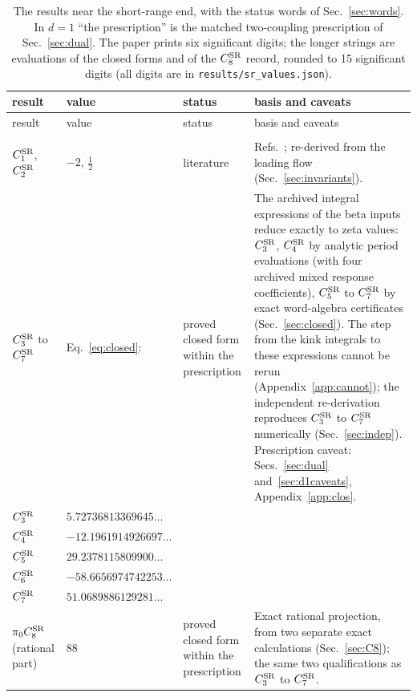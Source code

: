 \documentclass[11pt,a4paper]{article}
\numberwithin{equation}{section}
\newcommand{\CSR}{C^{\rm SR}}
\begin{document}
{\small
\renewcommand{\arraystretch}{1.2}
\begin{longtable}{@{}>{\raggedright\arraybackslash}p{}>{\raggedright\arraybackslash}p{}>{\raggedright\arraybackslash}p{}>{\raggedright\arraybackslash}p{}@{}}
\caption{The results near the short-range end, with the status words of Sec.~\ref{sec:words}. In $d=1$ ``the
prescription'' is the matched two-coupling prescription of Sec.~\ref{sec:dual}. The paper prints six significant
digits; the longer strings are evaluations of the closed forms and of the $\CSR_8$ record, rounded to 15 significant
digits (all digits are in \texttt{results/sr\_values.json}).}\label{tab:main}\\
\toprule
result & value & status & basis and caveats\\
\midrule\endfirsthead
\toprule
result & value & status & basis and caveats\\
\midrule\endhead
\bottomrule\endfoot
\multicolumn{4}{@{}l}{$d=1$}\\
$\CSR_1$, $\CSR_2$ & $-2$, $\frac12$ & literature & Refs.~\cite{Benedetti:2024wgx,Benedetti:2025nzp}; re-derived from the leading flow (Sec.~\ref{sec:invariants}).\\
$\CSR_3$ to $\CSR_7$ & Eq.~\eqref{eq:closed}: & proved closed form within the prescription & The archived integral expressions of the beta inputs reduce exactly to zeta values: $\CSR_3$, $\CSR_4$ by analytic period evaluations (with four archived mixed response coefficients), $\CSR_5$ to $\CSR_7$ by exact word-algebra certificates (Sec.~\ref{sec:closed}). The step from the kink integrals to these expressions cannot be rerun (Appendix~\ref{app:cannot}); the independent re-derivation reproduces $\CSR_3$ to $\CSR_7$ numerically (Sec.~\ref{sec:indep}). Prescription caveat: Secs.~\ref{sec:dual} and~\ref{sec:d1caveats}, Appendix~\ref{app:clos}.\\
\quad$\CSR_3$ & $5.72736813369645\ldots$ & & \\
\quad$\CSR_4$ & $-12.1961914926697\ldots$ & & \\
\quad$\CSR_5$ & $29.2378115809900\ldots$ & & \\
\quad$\CSR_6$ & $-58.6656974742253\ldots$ & & \\
\quad$\CSR_7$ & $51.0689886129281\ldots$ & & \\
$\pi_0\CSR_8$ (rational part) & $88$ & proved closed form within the prescription & Exact rational projection, from two separate exact calculations (Sec.~\ref{sec:C8}); the same two qualifications as $\CSR_3$ to $\CSR_7$.\\

\end{longtable}}
\end{document}
